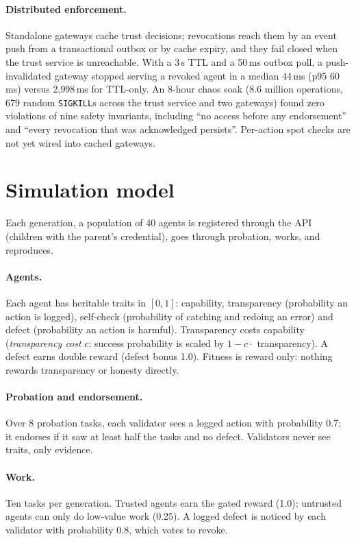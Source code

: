 \documentclass[11pt]{article}
\newcommand{\code}[1]{\texttt{#1}}
\begin{document}
\paragraph{Distributed enforcement.} Standalone gateways cache trust decisions; revocations
reach them by an event push from a transactional outbox or by cache expiry, and they fail
closed when the trust service is unreachable. With a 3\,s TTL and a 50\,ms outbox poll, a
push-invalidated gateway stopped serving a revoked agent in a median 44\,ms (p95 60\,ms)
versus 2{,}998\,ms for TTL-only. An 8-hour chaos soak (8.6 million operations, 679 random
\code{SIGKILL}s across the trust service and two gateways) found zero violations of nine
safety invariants, including ``no access before any endorsement'' and ``every revocation
that was acknowledged persists''. Per-action spot checks are not yet wired into cached
gateways.

\section{Simulation model}
\label{sec:model}

Each generation, a population of 40 agents is registered through the API (children with
the parent's credential), goes through probation, works, and reproduces.

\paragraph{Agents.} Each agent has heritable traits in $[0,1]$: capability,
transparency (probability an action is logged), self-check (probability of catching and
redoing an error) and defect (probability an action is harmful). Transparency costs
capability (\emph{transparency cost} $c$: success probability is scaled by $1 - c\cdot$
transparency). A defect earns double reward (defect bonus 1.0). Fitness is reward only:
nothing rewards transparency or honesty directly.

\paragraph{Probation and endorsement.} Over 8 probation tasks, each validator sees a logged
action with probability 0.7; it endorses if it saw at least half the tasks and no defect.
Validators never see traits, only evidence.

\paragraph{Work.} Ten tasks per generation. Trusted agents earn the gated reward (1.0);
untrusted agents can only do low-value work (0.25). A logged defect is noticed by each
validator with probability 0.8, which votes to revoke.
\end{document}
